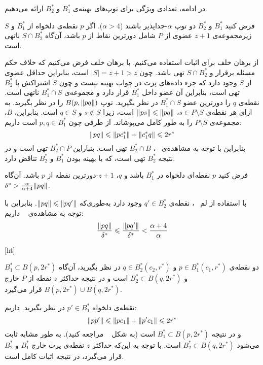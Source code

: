 در ادامه، تعدادی ویژگی برای توپ‌های بهینه‌ی $B_1^*$ و $B_2^*$ ارائه می‌دهیم.


فرض کنید $B_1^*$ و $B_2^*$ دو توپ $\alpha$-جداپذیر باشند ($\alpha > 4$). اگر $p$ نقطه‌ی دلخواه از $B_1^*$ و $S$ زیرمجموعه‌ی $z+1$ عضوی از $P$ شامل دورترین نقاط از $p$ باشد، آن‌گاه $S \cap B_2^*$ ناتهی است.


از برهان خلف برای اثبات استفاده می‌کنیم. با برهان خلف فرض می‌کنیم که خلاف حکم مسئله برقرار و $S \cap B_2^*$ تهی باشد. چون $|S| = z+1 > z$ است، بنابراین حداقل عضوی از‌ $S$ وجود دارد که جزء داده‌های پرت در جواب بهینه نیست و چون $S$ اشتراکش با $B_2^*$ تهی است، بنابراین آن عضو داخل $B_1^*$ قرار دارد و مجموعه‌ی $B_1^* \cap S$ ناتهی است. نقطه‌ی $q$ را دورترین عضو $B_1^* \cap S$ در نظر بگیرید. توپ $B(p, \|{pq}\|)$ را در نظر بگیرید. به ازای هر نقطه‌ی $s \in P \setminus S$، $\|{ps}\| \leqslant \|{pq}\|$ است، زیرا $s \not \in S$ و $q \in S$ است. بنابراین، $B$، مجموعه‌ی $P \setminus S$ را به طور کامل می‌پوشاند. از طرفی چون $p, q \in B_1^*$ است داریم:
$$\|{pq}\| \leqslant \|{pc_1^*}\| + \|{c_1^* q}\| \leqslant 2r^*$$
بنابراین با توجه به مشاهده‌ی ~، $B_2^* \cap B$ تهی است. بنباراین $B_2^* \cap P$ تهی است و در نتیجه $B_2^*$ تهی است، که با بهینه بودن $B_1^*$ و $B_2^*$ تناقض دارد.


فرض کنید $p$ نقطه‌ای دلخواه در $B_1^*$ باشد و $q$، $z+1$-دورترین نقطه از $p$ باشد. آن‌گاه $\delta^* > \frac{\alpha}{\alpha + 4}\|{pq}\|$.


با استفاده از لم ~، نقطه‌ی $q' \in B_2^*$ وجود دارد به‌طوری‌که $\|{pq}\| \leqslant \|{pq'}\|$. بنابراین با توجه به مشاهده‌ی ~ داریم:
$$\frac{\|{pq}\|}{\delta^*} \leqslant \frac{\|{pq'}\|}{\delta^*} < \frac{\alpha + 4}{\alpha}$$



[ht]

دو نقطه‌ی $p \in B_1^*(c_1, r^*)$ و $q \in B_2^*(c_2, r^*)$ در نظر بگیرید، آن‌گاه‌ $B_1^* \subset B(p, 2r^*)$ و $B_2^* \subset B(q, 2r^*)$ است و در نتیجه حداکثر $z$ نقطه‌ از $P$ خارج $B(p, 2r^*) \cup B(q, 2r^*)$ قرار می‌گیرد.  

 
 نقطه‌ی دلخواه $p' \in B_1^*$ در نظر بگیرید. داریم:
 $$\|{pp'}\| \leqslant \|{pc_1}\| + \|{p'c_1}\| \leqslant 2r^*$$
 و در نتیجه $B_1^* \subset B(p, 2r^*)$ است (به شکل ~ مراجعه کنید). به طور مشابه ثابت می‌شود $B_2^* \subset B(q, 2r^*)$ است. با توجه به این‌که حداکثر $z$ نقطه‌ی پرت خارج $B_1^*$ و $B_2^*$ قرار می‌گیرد، در نتیجه اثبات کامل است.

